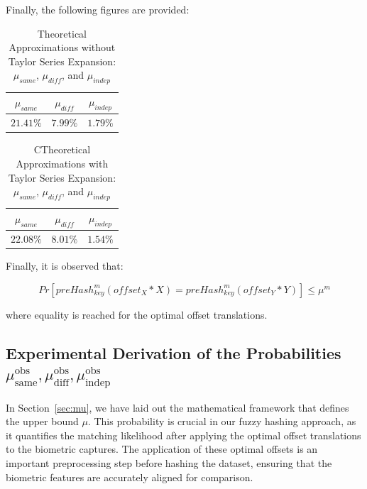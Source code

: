 Finally, the following figures are provided:

\begin{table}[H]
    \centering
    \renewcommand{\arraystretch}{1.25}\begin{tabular}{|c|c|c|}
        \hline
        $\mu_{same}$ & $\mu_{diff}$ & $\mu_{indep}$\\
        \hline
        $21.41\%$ & $7.99\%$ & $1.79\%$\\
        \hline
    \end{tabular}
\caption{Theoretical Approximations without Taylor Series Expansion: $\mu_{same}$, $\mu_{diff}$, and $\mu_{indep}$}
\label{tab:mu_approx}
\end{table}


\begin{table}[H]
    \centering
    \renewcommand{\arraystretch}{1.25}\begin{tabular}{|c|c|c|}
        \hline
        $\mu_{same}$ & $\mu_{diff}$ & $\mu_{indep}$\\
        \hline
        $22.08\%$ & $8.01\%$ & $1.54\%$\\
        \hline
    \end{tabular}
\caption{CTheoretical Approximations with Taylor Series Expansion: $\mu_{same}$, $\mu_{diff}$, and $\mu_{indep}$}
\label{tab:approximation_mu_taylor}
\end{table}

Finally, it is observed that:

\begin{equation}
    Pr[preHash_{key}^m(offset_X * X) = preHash_{key}^m(offset_Y * Y)] \leq \mu^m
\end{equation}

where equality is reached for the optimal offset translations.

\subsection{Experimental Derivation of the Probabilities \(\mu_{\text{same}}^{\text{obs}}, \mu_{\text{diff}}^{\text{obs}}, \mu_{\text{indep}}^{\text{obs}}\)}

In Section~\ref{sec:mu}, we have laid out the mathematical framework that defines the upper bound \(\mu\). This probability is crucial in our fuzzy hashing approach, as it quantifies the matching likelihood after applying the optimal offset translations to the biometric captures. The application of these optimal offsets is an important preprocessing step before hashing the dataset, ensuring that the biometric features are accurately aligned for comparison.

